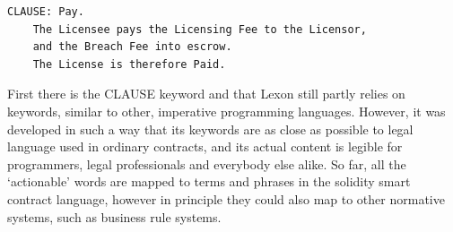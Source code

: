 \documentclass[conference]{IEEEtran}
\newtheorem{example}{Example}
\begin{document}

\begin{lstlisting}[caption={Example Lexon Clause}]
CLAUSE: Pay.
    The Licensee pays the Licensing Fee to the Licensor,
    and the Breach Fee into escrow.
    The License is therefore Paid.
\end{lstlisting}
First there is the CLAUSE keyword and that Lexon still partly relies on keywords, similar to other, imperative programming languages. However, it was developed in such a way that its keywords are as close as possible to legal language used in ordinary contracts, and its actual content is legible for programmers, legal professionals and everybody else alike.
So far, all the ‘actionable’ words are mapped to terms and phrases in the solidity smart contract language, however in principle they could also map to other normative systems, such as business rule systems. %
\end{document}
